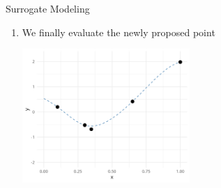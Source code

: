 \documentclass[11pt,compress,t,notes=noshow, xcolor=table]{beamer}
\begin{document}
\begin{vbframe}{Surrogate Modeling}
\begin{enumerate}
\framebreak 

\item We finally evaluate the newly proposed point
\vspace{+.45cm}

\begin{center}
  \includegraphics[width = 0.5\textwidth]{figure_man/loop_4.png}
\end{center}

\end{enumerate}

\end{vbframe}
\end{document}

